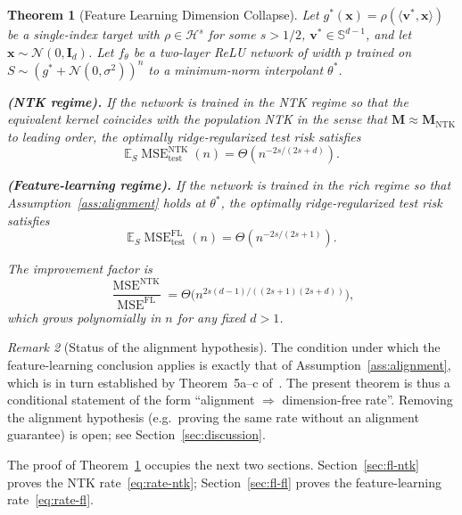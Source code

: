 \documentclass[12pt]{amsart}
\newtheorem{theorem}{Theorem}[section]
\theoremstyle{definition}
\theoremstyle{remark}
\newtheorem{remark}[theorem]{Remark}
\DeclareMathOperator{\MSE}{MSE}
\newcommand{\E}{\mathbb{E}}
\newcommand{\bx}{\mathbf{x}}
\newcommand{\bM}{\mathbf{M}}
\newcommand{\bI}{\mathbf{I}}
\newcommand{\bv}{\mathbf{v}}
\begin{document}
\begin{theorem}[Feature Learning Dimension Collapse]\label{thm:fl-collapse}
Let $g^{*}(\bx) = \rho(\langle \bv^{*}, \bx \rangle)$ be a single-index target
with $\rho \in \mathcal{H}^{s}$ for some $s > 1/2$, $\bv^{*} \in \mathbb{S}^{d-1}$,
and let $\bx \sim \mathcal{N}(0, \bI_{d})$. Let $f_{\theta}$ be a two-layer
ReLU network of width $p$ trained on $S \sim (g^{*} + \mathcal{N}(0,\sigma^{2}))^{n}$
to a minimum-norm interpolant $\theta^{*}$.

\textbf{(NTK regime).} If the network is trained in the NTK regime so that
the equivalent kernel coincides with the population NTK in the sense that
$\bM \approx \bM_{\mathrm{NTK}}$ to leading order, the optimally
ridge-regularized test risk satisfies
\begin{equation}\label{eq:rate-ntk}
  \E_{S} \MSE_{\mathrm{test}}^{\mathrm{NTK}}(n)
  = \Theta(n^{-2s/(2s+d)}).
\end{equation}

\textbf{(Feature-learning regime).} If the network is trained in the rich
regime so that Assumption~\ref{ass:alignment} holds at $\theta^{*}$, the
optimally ridge-regularized test risk satisfies
\begin{equation}\label{eq:rate-fl}
  \E_{S} \MSE_{\mathrm{test}}^{\mathrm{FL}}(n)
  = \Theta(n^{-2s/(2s+1)}).
\end{equation}

The improvement factor is
\[
  \frac{\MSE^{\mathrm{NTK}}}{\MSE^{\mathrm{FL}}}
  = \Theta\!\bigl(n^{2s(d-1)/((2s+1)(2s+d))}\bigr),
\]
which grows polynomially in $n$ for any fixed $d > 1$.
\end{theorem}

\begin{remark}[Status of the alignment hypothesis]\label{rem:status}
The condition under which the feature-learning conclusion applies is
exactly that of Assumption~\ref{ass:alignment}, which is in turn
established by Theorem~5a--c of~\cite{paperB}. The present theorem is thus
a conditional statement of the form ``alignment $\Rightarrow$ dimension-free
rate''. Removing the alignment hypothesis (e.g.\ proving the same rate
without an alignment guarantee) is open; see Section~\ref{sec:discussion}.
\end{remark}

The proof of Theorem~\ref{thm:fl-collapse} occupies the next two sections.
Section~\ref{sec:fl-ntk} proves the NTK rate~\eqref{eq:rate-ntk};
Section~\ref{sec:fl-fl} proves the feature-learning rate~\eqref{eq:rate-fl}.
\end{document}

